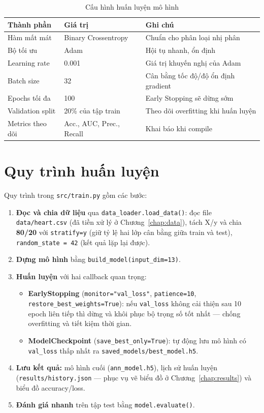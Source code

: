 \begin{table}[h]
\centering
\caption{Cấu hình huấn luyện mô hình}
\label{tab:trainconfig}
\begin{tabular}{lll}
\toprule
Thành phần & Giá trị & Ghi chú \\
\midrule
Hàm mất mát        & Binary Crossentropy & Chuẩn cho phân loại nhị phân \\
Bộ tối ưu          & Adam                & Hội tụ nhanh, ổn định \\
Learning rate      & 0.001               & Giá trị khuyến nghị của Adam \\
Batch size         & 32                  & Cân bằng tốc độ/độ ổn định gradient \\
Epochs tối đa      & 100                 & Early Stopping sẽ dừng sớm \\
Validation split   & 20\% của tập train  & Theo dõi overfitting khi huấn luyện \\
Metrics theo dõi   & Acc., AUC, Prec., Recall & Khai báo khi compile \\
\bottomrule
\end{tabular}
\end{table}

\section{Quy trình huấn luyện}
Quy trình trong \texttt{src/train.py} gồm các bước:
\begin{enumerate}
  \item \textbf{Đọc và chia dữ liệu} qua \texttt{data\_loader.load\_data()}:
        đọc file \texttt{data/heart.csv} (đã tiền xử lý ở
        Chương~\ref{chap:data}), tách X/y và chia \textbf{80/20} với
        \texttt{stratify=y} (giữ tỷ lệ hai lớp cân bằng giữa train và test),
        \texttt{random\_state = 42} (kết quả lặp lại được).
  \item \textbf{Dựng mô hình} bằng \texttt{build\_model(input\_dim=13)}.
  \item \textbf{Huấn luyện} với hai callback quan trọng:
        \begin{itemize}
          \item \textbf{EarlyStopping} (\texttt{monitor="val\_loss"},
                \texttt{patience=10}, \texttt{restore\_best\_weights=True}):
                nếu \texttt{val\_loss} không cải thiện sau 10 epoch liên tiếp
                thì dừng và khôi phục bộ trọng số tốt nhất --- chống
                overfitting và tiết kiệm thời gian.
          \item \textbf{ModelCheckpoint} (\texttt{save\_best\_only=True}):
                tự động lưu mô hình có \texttt{val\_loss} thấp nhất ra
                \texttt{saved\_models/best\_model.h5}.
        \end{itemize}
  \item \textbf{Lưu kết quả:} mô hình cuối (\texttt{ann\_model.h5}), lịch sử
        huấn luyện (\texttt{results/history.json} --- phục vụ vẽ biểu đồ ở
        Chương~\ref{chap:results}) và biểu đồ accuracy/loss.
  \item \textbf{Đánh giá nhanh} trên tập test bằng \texttt{model.evaluate()}.
\end{enumerate}

